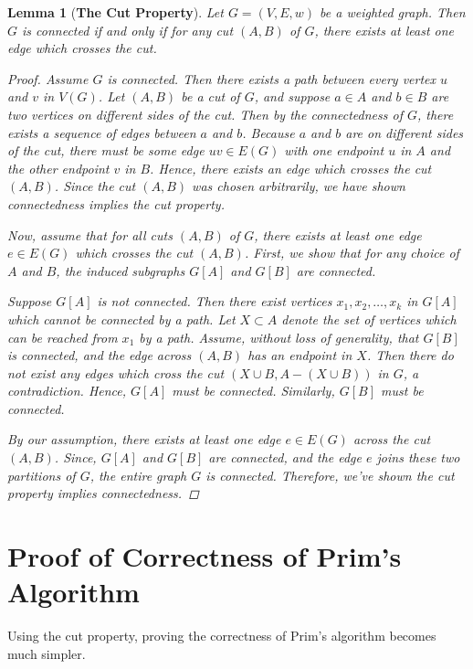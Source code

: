 \documentclass[a4paper,11pt]{report}
\theoremstyle{plain}
\newtheorem{lem}[thm]{Lemma}
\theoremstyle{definition}
\begin{document}
\begin{lem}[{\bfseries The Cut Property}]
Let $G = (V, E, w)$ be a weighted graph. Then $G$ is connected if and only if
for any cut $(A, B)$ of $G$, there exists at least one edge which crosses the
cut.

\begin{proof}
Assume $G$ is connected. Then there exists a path between every vertex $u$ and
$v$ in $V(G)$. Let $(A, B)$ be a cut of $G$, and suppose $a \in A$ and $b \in
B$ are two vertices on different sides of the cut. Then by the connectedness of
$G$, there exists a sequence of edges between $a$ and $b$. Because $a$ and $b$
are on different sides of the cut, there must be some edge $uv \in E(G)$ with
one endpoint $u$ in $A$ and the other endpoint $v$ in $B$. Hence, there
exists an edge which crosses the cut $(A, B)$. Since the cut $(A, B)$ was
chosen arbitrarily, we have shown connectedness implies the cut property.

Now, assume that for all cuts $(A, B)$ of $G$, there exists at least one edge
$e \in E(G)$ which crosses the cut $(A, B)$. First, we show that for any choice
of $A$ and $B$, the induced subgraphs $G[A]$ and $G[B]$ are connected.

Suppose $G[A]$ is not connected. Then there exist vertices $x_1, x_2, \ldots,
x_k$ in $G[A]$ which cannot be connected by a path. Let $X \subset A$ denote
the set of vertices which can be reached from $x_1$ by a path. Assume, without
loss of generality, that $G[B]$ is connected, and the edge across $(A, B)$ has
an endpoint in $X$. Then there do not exist any edges which cross the cut $(X
\cup B, A - (X \cup B))$ in $G$, a contradiction. Hence, $G[A]$ must be
connected. Similarly, $G[B]$ must be connected.

By our assumption, there exists at least one edge $e \in E(G)$ across the cut
$(A, B)$.  Since, $G[A]$ and $G[B]$ are connected, and the edge $e$ joins these
two partitions of $G$, the entire graph $G$ is connected. Therefore, we've
shown the cut property implies connectedness.
\end{proof}
\end{lem}


\section{Proof of Correctness of Prim's Algorithm}

Using the cut property, proving the correctness of Prim's algorithm becomes
much simpler.
\end{document}
